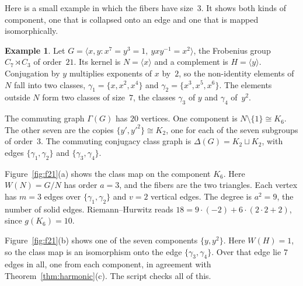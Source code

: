 \documentclass[12pt,letterpaper]{article}
\numberwithin{equation}{section}
\theoremstyle{plain}
\theoremstyle{definition}
\newtheorem{example}[theorem]{Example}
\begin{document}
Here is a small example in which the fibers have size~$3$. It shows both
kinds of component, one that is collapsed onto an edge and one that is
mapped isomorphically.

\begin{example}\label{ex:f21}
Let $G=\langle x,y : x^7=y^3=1,\ yxy^{-1}=x^2\rangle$, the Frobenius group
$C_7\rtimes C_3$ of order~$21$. Its kernel is $N=\langle x\rangle$ and a
complement is $H=\langle y\rangle$. Conjugation by $y$ multiplies exponents
of $x$ by~$2$, so the non-identity elements of $N$ fall into two classes,
$\gamma_1=\{x,x^2,x^4\}$ and $\gamma_2=\{x^3,x^5,x^6\}$. The elements outside
$N$ form two classes of size~$7$, the classes $\gamma_3$ of $y$ and
$\gamma_4$ of~$y^2$.

The commuting graph $\Gamma(G)$ has $20$ vertices. One component is
$N\setminus\{1\}\cong K_6$. The other seven are the copies $\{y',y'^2\}\cong
K_2$, one for each of the seven subgroups of order~$3$. The commuting
conjugacy class graph is $\Delta(G)=K_2\sqcup K_2$, with edges
$\{\gamma_1,\gamma_2\}$ and $\{\gamma_3,\gamma_4\}$.

Figure~\ref{fig:f21}(a) shows the class map on the component $K_6$. Here
$W(N)=G/N$ has order $a=3$, and the fibers are the two triangles. Each
vertex has $m=3$ edges over $\{\gamma_1,\gamma_2\}$ and $v=2$ vertical
edges. The degree is $a^2=9$, the number of solid edges.
Riemann--Hurwitz reads $18=9\cdot(-2)+6\cdot(2\cdot2+2)$, since
$g(K_6)=10$.

Figure~\ref{fig:f21}(b) shows one of the seven components $\{y,y^2\}$. Here
$W(H)=1$, so the class map is an isomorphism onto the edge
$\{\gamma_3,\gamma_4\}$. Over that edge lie $7$ edges in all, one from each
component, in agreement with Theorem~\ref{thm:harmonic}(c). The script
checks all of this.
\end{example}
\end{document}
